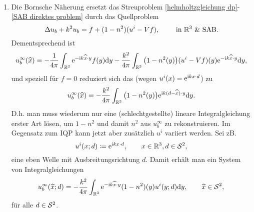 \begin{counter bem plain}\
	\begin{enumerate}[label=(\roman*)]
		\item Die Bornsche Näherung ersetzt das Streuproblem \eqref{helmholtzgleichung dp}-\eqref{SAB direktes problem} durch das Quellproblem
		\begin{equation*}
			\Delta u_b+k^2u_b=f+(1-n^2)(u^i-Vf),\qquad\text{ in }\mathbb{R}^3\text{ \& SAB.}
		\end{equation*}
		Dementsprechend ist %
		\begin{equation*}
			u_b^\infty(\widehat{x})=-\frac{1}{4\pi}\int_{\mathbb{R}^3}\mathrm{e}^{-\mathrm{i} k\widehat{x}\cdot y}f(y)\mathrm{d}y-\frac{k^2}{4\pi}\int_{\mathbb{R}^3}\big(1-n^2(y)\big)(u^i-Vf)(y)\mathrm{e}^{-\mathrm{i} k\widehat{x}\cdot y}\mathrm{d}y,
		\end{equation*}
		und speziell für \(f=0\) reduziert sich das (wegen \(u^i(x)=\mathrm{e}^{\mathrm{i} kx\cdot d}\)) zu
		\begin{equation}
			\label{system von gleichungen für vereinfachtes fernfeld der bornschen näherung}
			u_b^\infty(\widehat{x})=-\frac{k^2}{4\pi}\int_{\mathbb{R}^3}\big(1-n^2(y)\big)\mathrm{e}^{\mathrm{i} k(d-\widehat{x})\cdot y}\mathrm{d}y.
		\end{equation}
		D.h. man muss wiederum \glqq{}nur\grqq{} eine (schlechtgestellte) lineare Integralgleichung erster Art lösen, um \(1-n^2\) und damit \(n^2\) aus \(u_b^\infty\) zu rekonstruieren. 
		Im Gegensatz zum IQP kann jetzt aber zusätzlich \(u^i\) variiert werden. Sei zB.
		\begin{equation*}
			u^i(x;d)\coloneqq\mathrm{e}^{\mathrm{i} kx\cdot d},\qquad x\in\mathbb{R}^3,d\in\mathcal{S}^2,
		\end{equation*}
		eine eben Welle mit Ausbreitungsrichtung \(d\). Damit erhält man ein System von Integralgleichungen
		\begin{equation*}
			u_b^\infty(\widehat{x};d)=-\frac{k^2}{4\pi}\int_{\mathbb{R}^3}\mathrm{e}^{-\mathrm{i} k\widehat{x}\cdot y} (1-n^2)(y) u^i(y;d)\mathrm{d}y,\qquad\widehat{x}\in\mathcal{S}^2,
		\end{equation*}
		für alle \(d\in\mathcal{S}^2\).
		

\end{enumerate}
\end{counter bem plain}
